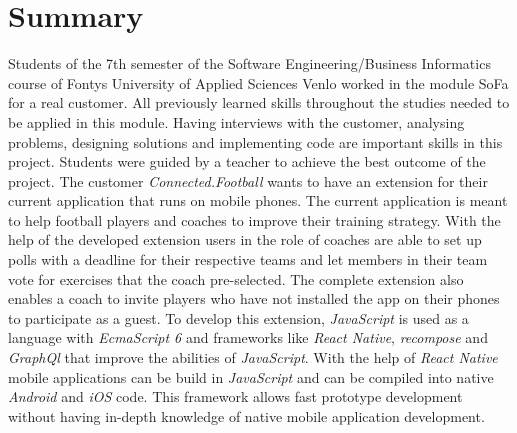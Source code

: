 \section*{Summary}

Students of the 7th semester of the Software Engineering/Business Informatics course of Fontys University of Applied Sciences Venlo worked in the module SoFa for a real customer. All previously learned skills throughout the studies needed to be applied in this module. Having interviews with the customer, analysing problems, designing solutions and implementing code are important skills in this project. Students were guided by a teacher to achieve the best outcome of the project. 
\newline
The customer \textit{Connected.Football} wants to have an extension for their current application that runs on mobile phones. The current application is meant to help football players and coaches to improve their training strategy. With the help of the developed extension users in the role of coaches are able to set up polls with a deadline for their respective teams and let members in their team vote for exercises that the coach pre-selected. The complete extension also enables a coach to invite players who have not installed the app on their phones to participate as a guest.
\newline
To develop this extension, \textit{JavaScript} is used as a language with \textit{EcmaScript 6} and frameworks like \textit{React Native}, \textit{recompose} and \textit{GraphQl} that improve the abilities of \textit{JavaScript}. With the help of \textit{React Native} mobile applications can be build in \textit{JavaScript} and can be compiled into native \textit{Android} and \textit{iOS} code. This framework allows fast prototype development without having in-depth knowledge of native mobile application development.